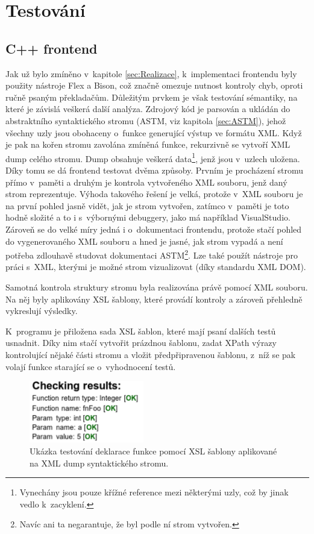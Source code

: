 \documentclass[11pt,twoside,a4paper]{book}
\begin{document}
\chapter{Testování}
\label{sec:Testovani}

\section{C++ frontend}
Jak už bylo zmíněno v~kapitole \ref{sec:Realizace}, k~implementaci frontendu byly použity nástroje Flex a Bison, což
značně omezuje nutnost kontroly chyb, oproti ručně psaným překladačům. Důležitým prvkem je však testování
sémantiky, na které je závislá veškerá další analýza. Zdrojový kód je parsován a ukládán
do abstraktního syntaktického stromu (ASTM, viz kapitola \ref{sec:ASTM}), jehož všechny uzly jsou obohaceny o~funkce generující výstup ve formátu
XML. Když je pak na kořen stromu zavolána zmíněná funkce, rekurzivně se vytvoří XML dump celého stromu.
Dump obsahuje {veškerá data}\footnote{Vynechány jsou pouze křížné reference mezi některými uzly, což by jinak vedlo k~zacyklení.}, jenž jsou v~uzlech uložena.
Díky tomu se dá frontend testovat dvěma způsoby. Prvním je procházení stromu přímo v~paměti a druhým je kontrola vytvořeného XML souboru, jenž daný strom reprezentuje.
Výhoda takového řešení je velká, protože v~XML souboru je na první pohled jasně vidět, jak je strom vytvořen, zatímco v~paměti je toto hodně složité
a to i s~výbornými debuggery, jako má například VisualStudio. Zároveň se do velké míry jedná i o~dokumentaci frontendu, protože stačí
pohled do vygenerovaného XML souboru a hned je jasné, jak strom vypadá a není potřeba zdlouhavě studovat dokumentaci ASTM\footnote{Navíc ani ta negarantuje, že byl podle ní strom vytvořen.}.
Lze také použít nástroje pro práci s~XML, kterými je možné strom vizualizovat (díky standardu XML DOM).

Samotná kontrola struktury stromu byla realizována právě pomocí XML souboru. Na něj byly aplikovány XSL šablony, které provádí kontroly
a zároveň přehledně vykreslují výsledky.

K~programu je přiložena sada XSL šablon, které mají psaní dalších testů usnadnit.
Díky nim stačí vytvořit prázdnou šablonu, zadat XPath výrazy kontrolující nějaké části stromu a vložit předpřipravenou šablonu, z~níž se pak volají
funkce starající se o~vyhodnocení testů.

\begin{figure}[H]
\begin{center}
\includegraphics[width=5cm]{figures/testing.pdf}
\caption{Ukázka testování deklarace funkce pomocí XSL šablony aplikované na XML dump syntaktického stromu.}
\label{fig:testing}
\end{center}
\end{figure}
\end{document}
